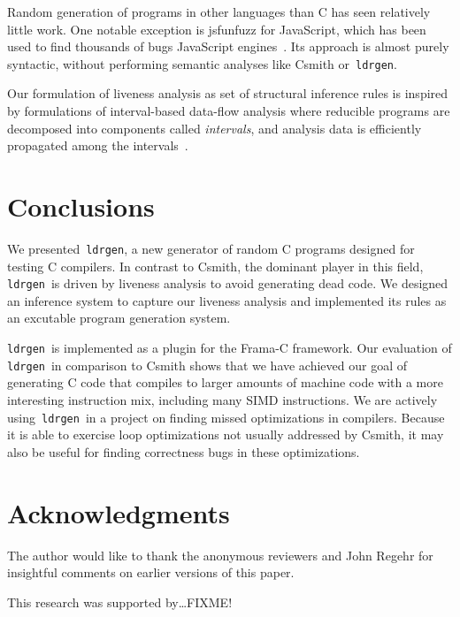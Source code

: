 \documentclass{llncs}
\newcommand\ldrgen{\texttt{ldrgen}}
\begin{document}
Random generation of programs in other languages than C has seen relatively
little work. One notable exception is jsfunfuzz for JavaScript, which has
been used to find thousands of bugs JavaScript engines~\cite{jsfunfuzz}. Its
approach is almost purely syntactic, without performing semantic analyses
like Csmith or~\ldrgen.

Our formulation of liveness analysis as set of structural inference rules is
inspired by formulations of interval-based data-flow analysis where
reducible programs are decomposed into components called \emph{intervals},
and analysis data is efficiently propagated among the
intervals~\cite{allen-1970,cocke-1970,graham.wegman-1976}.

\section{Conclusions}

We presented~\ldrgen, a new generator of random C programs designed for
testing C compilers. In contrast to Csmith, the dominant player in this
field, \ldrgen\ is driven by liveness analysis to avoid generating dead
code. We designed an inference system to capture our liveness analysis and
implemented its rules as an excutable program generation system.

\ldrgen\ is implemented as a plugin for the Frama-C framework. Our
evaluation of \ldrgen\ in comparison to Csmith shows that we have achieved
our goal of generating C code that compiles to larger amounts of machine
code with a more interesting instruction mix, including many SIMD
instructions. We are actively using~\ldrgen\ in a project on finding missed
optimizations in compilers. Because it is able to exercise loop
optimizations not usually addressed by Csmith, it may also be useful for
finding correctness bugs in these optimizations.

\section*{Acknowledgments}

The author would like to thank the anonymous reviewers and John Regehr for
insightful comments on earlier versions of this paper.

This research was supported by\dots FIXME!




\end{document}
